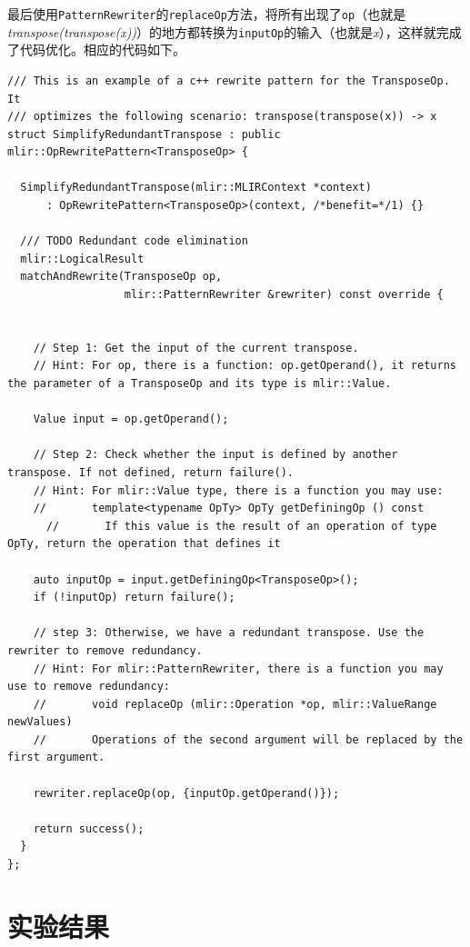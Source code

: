 \documentclass[lang=cn,11pt,a4paper]{elegantpaper}
\begin{document}
最后使用\texttt{PatternRewriter}的\texttt{replaceOp}方法，将所有出现了\texttt{op}（也就是\textit{transpose(transpose(x))}）的地方都转换为\texttt{inputOp}的输入（也就是\textit{x}），这样就完成了代码优化。相应的代码如下。

\begin{lstlisting}
/// This is an example of a c++ rewrite pattern for the TransposeOp. It
/// optimizes the following scenario: transpose(transpose(x)) -> x
struct SimplifyRedundantTranspose : public mlir::OpRewritePattern<TransposeOp> {

  SimplifyRedundantTranspose(mlir::MLIRContext *context)
      : OpRewritePattern<TransposeOp>(context, /*benefit=*/1) {}

  /// TODO Redundant code elimination
  mlir::LogicalResult
  matchAndRewrite(TransposeOp op,
                  mlir::PatternRewriter &rewriter) const override {


    // Step 1: Get the input of the current transpose.
    // Hint: For op, there is a function: op.getOperand(), it returns the parameter of a TransposeOp and its type is mlir::Value.

    Value input = op.getOperand();

    // Step 2: Check whether the input is defined by another transpose. If not defined, return failure().
    // Hint: For mlir::Value type, there is a function you may use:
    //       template<typename OpTy> OpTy getDefiningOp () const
 	  //       If this value is the result of an operation of type OpTy, return the operation that defines it

    auto inputOp = input.getDefiningOp<TransposeOp>();
    if (!inputOp) return failure();

    // step 3: Otherwise, we have a redundant transpose. Use the rewriter to remove redundancy.
    // Hint: For mlir::PatternRewriter, there is a function you may use to remove redundancy:
    //       void replaceOp (mlir::Operation *op, mlir::ValueRange newValues)
    //       Operations of the second argument will be replaced by the first argument.

    rewriter.replaceOp(op, {inputOp.getOperand()});

    return success();
  }
};
\end{lstlisting}

\section{实验结果}
\end{document}

